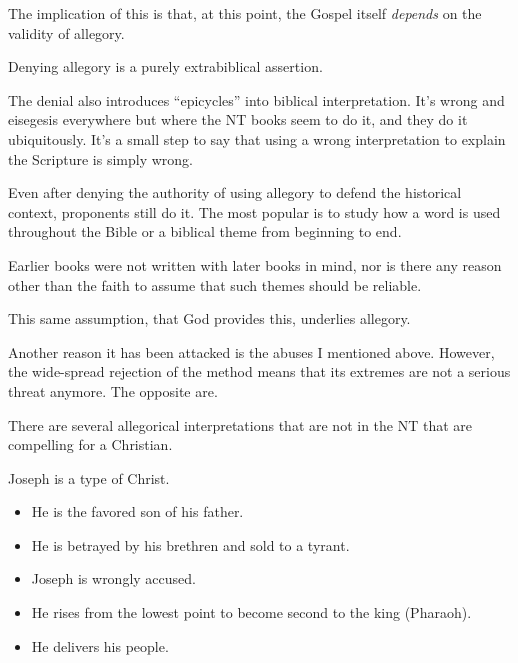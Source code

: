 \documentclass{beamer}
\begin{document}
\begin{frame}
  The implication of this is that, at this point, the Gospel itself \emph{depends} on the validity of allegory.
\end{frame}

\begin{frame}
  Denying allegory is a purely extrabiblical assertion.
\end{frame}

\begin{frame}
  The denial also introduces ``epicycles'' into biblical interpretation.
  It's wrong and eisegesis everywhere but where the NT books seem to do it, and they do it ubiquitously.
  It's a small step to say that using a wrong interpretation to explain the Scripture is simply wrong.
\end{frame}

\begin{frame}
  Even after denying the authority of using allegory to defend the historical context, proponents still do it.
  The most popular is to study how a word is used throughout the Bible or a biblical theme from beginning to end.
\end{frame}

\begin{frame}
  Earlier books were not written with later books in mind, nor is there any reason other than the faith to assume that such themes should be reliable.
\end{frame}

\begin{frame}
  This same assumption, that God provides this, underlies allegory.
\end{frame}

\begin{frame}
  Another reason it has been attacked is the abuses I mentioned above.
  However, the wide-spread rejection of the method means that its extremes are not a serious threat anymore.
  The opposite are.
\end{frame}

\begin{frame}
  There are several allegorical interpretations that are not in the NT that are compelling for a Christian.
\end{frame}

\begin{frame}
  Joseph is a type of Christ.\pause
  \begin{itemize}
	\item He is the favored son of his father.\pause
	\item He is betrayed by his brethren and sold to a tyrant.\pause
	\item Joseph is wrongly accused.\pause
	\item He rises from the lowest point to become second to the king (Pharaoh).\pause
	\item He delivers his people.
  \end{itemize}
\end{frame}
\end{document}
